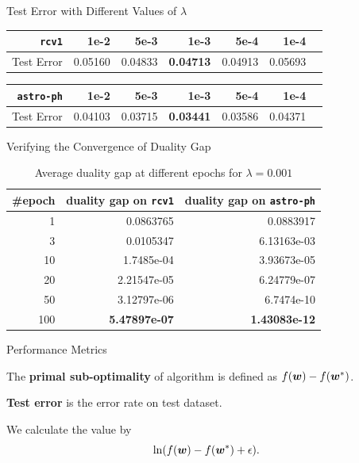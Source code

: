 \begin{frame}{Test Error with Different Values of $\lambda$}
\begin{table}[htbp]
    \centering
    \begin{tabular}{|r|r|r|r|r|r|r|}
        \hline
        \texttt{rcv1} & 1e-2 & 5e-3 & \textbf{1e-3} & 5e-4 & 1e-4\\
        \hline
        Test Error & 0.05160 & 0.04833 & \textbf{0.04713} & 0.04913 & 0.05693 \\
        \hline
    \end{tabular}
\end{table}
\begin{table}[htbp]
    \begin{tabular}{|r|r|r|r|r|r|r|}
        \hline
         \texttt{astro-ph} & 1e-2 & 5e-3 & \textbf{1e-3} & 5e-4 & 1e-4 \\
        \hline
        Test Error & 0.04103 & 0.03715 & \textbf{0.03441} & 0.03586 & 0.04371 \\
        \hline
    \end{tabular}
\end{table}
\end{frame}

\begin{frame}{Verifying the Convergence of Duality Gap}
\begin{table}[htbp]
    \centering
    \caption{Average duality gap at different epochs for $\lambda = 0.001$} 
    \label{table:covdual1}
    \begin{tabular}{|r|r|r|}
        \hline
        \#epoch & duality gap on \texttt{rcv1} & duality gap on \texttt{astro-ph} \\ 
        \hline
        1 & 0.0863765 & 0.0883917\\
        3 & 0.0105347 & 6.13163e-03 \\
        10 & 1.7485e-04 & 3.93673e-05 \\
        20 & 2.21547e-05 & 6.24779e-07 \\
        50 & 3.12797e-06 & 6.7474e-10\\
        100 & \textbf{5.47897e-07} & \textbf{1.43083e-12} \\
        \hline
    \end{tabular}
\end{table}
\end{frame}

\begin{frame}{Performance Metrics}
\begin{definition}\label{def:psds}
The \textbf{primal sub-optimality} of algorithm is defined as $f(\bm{w}) - f(\bm{w}^*)$. 
\end{definition}
\begin{definition}
\textbf{Test error} is the error rate on test dataset.
\end{definition}
We calculate the value by 
\begin{equation*}
\ln(f(\bm{w})-f(\bm{w}^*) + \epsilon).
\end{equation*}
\end{frame}

